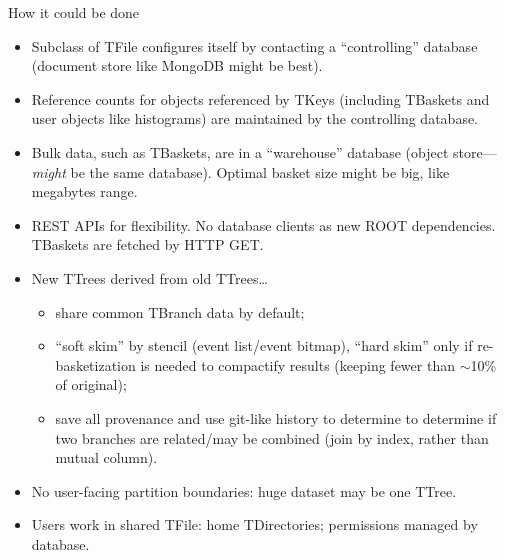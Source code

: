 \documentclass[aspectratio=169]{beamer}
\begin{document}
\begin{frame}{How it could be done}
\vspace{0.3 cm}
\begin{itemize}
\item<1-> Subclass of TFile configures itself by contacting a ``controlling'' database (document store like MongoDB might be best).
\item<2-> Reference counts for objects referenced by TKeys (including TBaskets and user objects like histograms) are maintained by the controlling database.
\item<3-> Bulk data, such as TBaskets, are in a ``warehouse'' database (object store--- {\it might} be the same database). Optimal basket size might be big, like megabytes range.
\item<4-> REST APIs for flexibility. No database clients as new ROOT dependencies. TBaskets are fetched by HTTP GET.
\item<5-> New TTrees derived from old TTrees\ldots
\begin{itemize}
\item<6-> share common TBranch data by default;
\item<7-> ``soft skim'' by stencil (event list/event bitmap), ``hard skim'' only if re-basketization is needed to compactify results (keeping fewer than $\sim$10\% of original);
\item<8-> save all provenance and use git-like history to determine to determine if two branches are related/may be combined (join by index, rather than mutual column).
\end{itemize}
\item<9-> No user-facing partition boundaries: huge dataset may be one TTree.
\item<10-> Users work in shared TFile: home TDirectories; permissions managed by database.
\end{itemize}
\end{frame}
\end{document}
